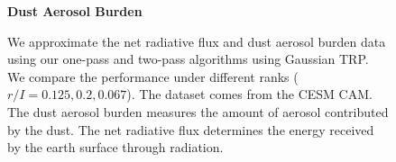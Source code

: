 \begin{figure}[ht]
	\textbf{Dust Aerosol Burden}
	\caption{We approximate the net radiative flux and dust aerosol burden data using our one-pass and two-pass algorithms using Gaussian TRP. We compare the performance under different ranks ($r/I = 0.125,0.2,0.067$). The dataset comes from the CESM CAM. The dust aerosol burden measures the amount of aerosol contributed by the dust. The net radiative flux determines the energy received by the earth surface through radiation. } \label{fig:srfrad_burden_dust}
\end{figure}
